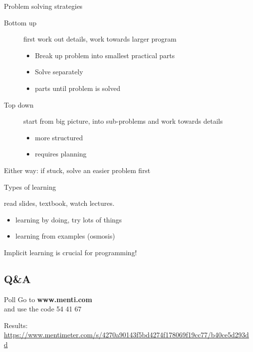 \documentclass[aspectratio=169,usenames,dvipsnames]{beamer}
\begin{document}
\begin{frame}{Problem solving strategies}
    \begin{description}
        \item[Bottom up] first work out details, work towards larger program
            \begin{itemize}
                \item Break up problem into smallest practical parts
                \item Solve separately
                \item {} parts until problem is solved
            \end{itemize}
        \item[Top down] start from big picture,  into sub-problems and work towards details
            \begin{itemize}
                \item more structured
                \item requires planning
            \end{itemize}
    \end{description}

    \vspace{1em}
    Either way: if stuck, solve an easier problem first
\end{frame}

\begin{frame}{Types of learning}
    \begin{description}
        \item[Explicit learning]
            read slides, textbook, watch lectures.
        \item[Implicit learning]
            \begin{itemize}
                \item learning by doing, try lots of things
                \item learning from examples (osmosis)
            \end{itemize}
    \end{description}

    \vspace{1em}
    Implicit learning is crucial for programming!
\end{frame}

\subsection{Q\&A}
\begin{frame}{Poll}
    \Large Go to \textbf{www.menti.com} \\
    and use the code 54 41 67

    \vspace{2em}\small
    Results:\\
    \url{https://www.mentimeter.com/s/4270a90143f5bd4274f178069f19cc77/b40ce5d293dd}
\end{frame}
\end{document}
